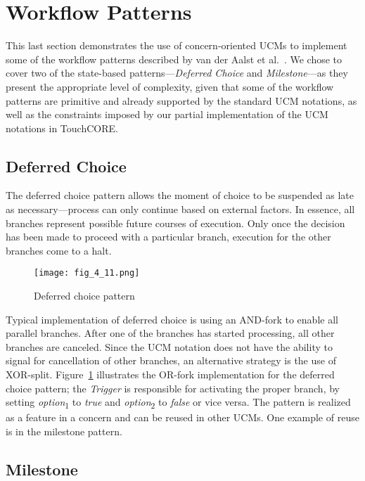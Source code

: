 
\section{Workflow Patterns} \label{sec:4.3}

This last section demonstrates the use of concern-oriented UCMs to implement some of the workflow patterns described by van der Aalst et al.~\cite{van2003workflow}. We chose to cover two of the state-based patterns---\emph{Deferred Choice} and \emph{Milestone}---as they present the appropriate level of complexity, given that some of the workflow patterns are primitive and already supported by the standard UCM notations, as well as the constraints imposed by our partial implementation of the UCM notations in TouchCORE.

\subsection{Deferred Choice}

The deferred choice pattern allows the moment of choice to be suspended as late as necessary---process can only continue based on external factors. In essence, all branches represent possible future courses of execution. Only once the decision has been made to proceed with a particular branch, execution for the other branches come to a halt. 

\begin{figure}[h]
	\centering
	\texttt{[image: fig\_4\_11.png]}
	\caption{Deferred choice pattern}
	\label{fig:4.11}
\end{figure}

Typical implementation of deferred choice is using an AND-fork to enable all parallel branches. After one of the branches has started processing, all other branches are canceled. Since the UCM notation does not have the ability to signal for cancellation of other branches, an alternative strategy is the use of XOR-split. Figure~\ref{fig:4.11} illustrates the OR-fork implementation for the deferred choice pattern; the \emph{Trigger} is responsible for activating the proper branch, by setting \emph{option}\textsubscript{1} to \emph{true} and \emph{option}\textsubscript{2} to \emph{false} or vice versa. The pattern is realized as a feature in a concern and can be reused in other UCMs. One example of reuse is in the milestone pattern.

\subsection{Milestone}


